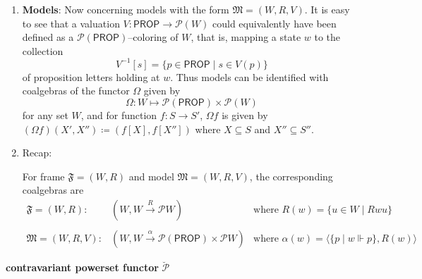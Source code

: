 \begin{example}
\begin{enumerate}[itemsep=5pt,parsep=5pt,leftmargin=3em,topsep=5pt,label=(\arabic*)]
	

	\item \textbf{Models}: 
	Now concerning models with the form $\mathfrak{M} = (W,R,V)$. 
	It is easy to see that a valuation $V \colon \mathsf{PROP} \to \mathcal{P}(W)$ could equivalently have been defined as a $\mathcal{P}(\mathsf{PROP})$--coloring of $W$, 
	that is, 
	mapping a state $w$ to the collection 
	\[
		V^{-1}[s] = \{p \in \mathsf{PROP} \mid s \in V(p)\}
	\]
	of proposition letters holding at $w$. 
	Thus models can be identified with coalgebras of the functor $\Omega$ given by 
	\[
		\Omega \colon W \mapsto \mathcal{P}(\mathsf{PROP}) \times \mathcal{P}(W)
	\]
	for any set $W$,  
	and for function $f \colon S \to S'$, 
	$\Omega f$ is given by $(\Omega f)(X',X'') \coloneqq (f[X],f[X''])$ where $X \subseteq S$ and $X'' \subseteq S''$.

	\item Recap:
	
	For frame $\mathfrak{F} = (W,R)$ and model $\mathfrak{M} = (W,R,V)$, 
	the corresponding coalgebras are \\
	
	$\begin{array}{lll}
		\mathfrak{F} = (W,R): 
		& 
		(W, W \xrightarrow{R} \mathcal{P}W)
		& 
		\text{where~}
		R(w) =\{u \in W \mid Rwu\}  \\  

		\\

		\mathfrak{M} = (W,R,V):
		&
		(W, W \xrightarrow{\alpha} \mathcal{P}(\mathsf{PROP}) \times \mathcal{P}W) 
		&
		\text{where~}
		\alpha(w)=\langle \{p \mid w \Vdash p\},R(w)  \rangle
	\end{array}$
	\end{enumerate}
\end{example}



\begin{example}
	\textbf{contravariant powerset functor} $\breve{\mathcal{P}}$
\end{example}

